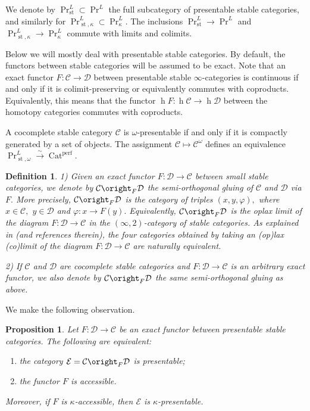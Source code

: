 \documentclass[11pt,leqno]{amsart}
\newtheorem{defi}[theo]{Definition}
\newtheorem{prop}[theo]{Proposition}
\numberwithin{equation}{section}
\def\h{\operatorname{h}}
\newcommand{\xto}{\xrightarrow}
\newcommand{\Cat}{\operatorname{Cat}}
\newcommand{\st}{\operatorname{st}}
\newcommand{\cD}{{\mathcal D}}
\newcommand{\cC}{{\mathcal C}}
\newcommand{\cE}{{\mathcal E}}
\newcommand{\perf}{\operatorname{perf}}
\begin{document}
We denote by $\Pr^L_{\st}\subset \Pr^L$ the full subcategory of presentable stable categories, and similarly for $\Pr^L_{\st,\kappa}\subset\Pr^L_{\kappa}.$ 
The inclusions $\Pr^L_{\st}\to\Pr^L$ and $\Pr^L_{\st,\kappa}\to\Pr^L_{\kappa}$ commute with limits and colimits.  

Below we will mostly deal with presentable stable categories. By default, the functors between stable categories will be assumed to be exact. Note that an exact functor $F:\cC\to\cD$ between presentable stable $\infty$-categories is continuous if and only if it is colimit-preserving or equivalently commutes with coproducts. Equivalently, this means that the functor $\h F:\h\cC\to \h\cD$ between the homotopy categories commutes with coproducts.

A cocomplete stable category $\cC$ is $\omega$-presentable if and only if it is compactly generated by a set of objects.
The assignment $\cC\mapsto \cC^{\omega}$ defines an equivalence $\Pr^L_{\st,\omega}\xto{\sim}\Cat^{\perf}.$

\begin{defi}\label{defi:gluing_general} 1) Given an exact functor $F:\cD\to\cC$ between small stable categories, we denote by $\cC\oright_F \cD$ the semi-orthogonal gluing of $\cC$ and $\cD$ via $F.$ More precisely, $\cC\oright_F \cD$ is the category of triples $(x,y,\varphi),$ where $x\in\cC,$ $y\in\cD$ and $\varphi:x\to F(y).$ Equivalently, $\cC\oright_F\cD$ is the oplax limit of the diagram $F:\cD\to\cC$ in the $(\infty,2)$-category of stable categories. As explained in \cite[Theorem 2.4.2]{CDW23} (and references therein), the four categories obtained by taking an (op)lax (co)limit of the diagram $F:\cD\to\cC$ are naturally equivalent.

2) If $\cC$ and $\cD$ are cocomplete stable categories and $F:\cD\to\cC$ is an arbitrary exact functor, we also denote by $\cC\oright_F\cD$ the same semi-orthogonal gluing as above.\end{defi} 

We make the following observation.

\begin{prop}\label{prop:gluing_presentable} Let $F:\cD\to\cC$ be an exact functor between presentable stable categories. The following are equivalent:

\begin{enumerate}[label=(\roman*),ref=(\roman*)]

\item  the category $\cE=\cC\oright_F \cD$ is presentable; \label{acc1}

\item the functor $F$ is accessible. \label{acc2}
\end{enumerate}

Moreover, if $F$ is $\kappa$-accessible, then $\cE$ is $\kappa$-presentable.
\end{prop}
\end{document}
